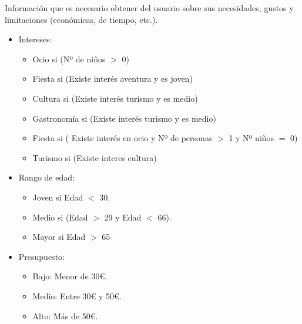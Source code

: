 \documentclass[11pt, a4paper, spanish, openright, twoside]{book}
\begin{document}
\begin{section}{Información que es necesario obtener del usuario sobre sus necesidades, gustos y limitaciones (económicas, de tiempo, etc.).}
				\begin{itemize}
					\item Intereses:
						\begin{itemize}
							\item Ocio si (Nº de niños $>$ 0)
							\item Fiesta si (Existe interés aventura y es joven)
							\item Cultura si (Existe interés turismo y es medio)
							\item Gastronomía si (Existe interés turismo y es medio)
							\item Fiesta si ( Existe interés en ocio y Nº de personas $>$ 1 y Nº niños $=$ 0)
							\item Turismo si (Existe interes cultura)
						\end{itemize}
					\item Rango de edad: 
						\begin{itemize}
							\item Joven si Edad $<$ 30.
							\item Medio si (Edad $>$ 29 y Edad $<$ 66).
							\item Mayor si Edad $>$ 65 
						\end{itemize}
					\item Presupuesto:
						\begin{itemize}
							\item Bajo: Menor de 30€.
							\item Medio: Entre 30€ y 50€.
							\item Alto: Más de 50€.
						\end{itemize}
						
				\end{itemize}
			
	\end{section}
\end{document}
